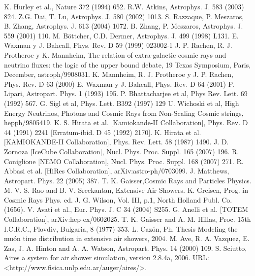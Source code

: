 \begin{thebibliography}{1}
 K. Hurley et al., Nature 372 (1994) 652.
 R.W. Atkins, Astrophys. J. 583 (2003) 824.
 Z.G. Dai, T. Lu, Astrophys. J. 580 (2002) 1013.
 S. Razzaque, P. Meszaros, B. Zhang, Astrophys. J. 613 (2004) 1072.
 B. Zhang, P. Meszaros, Astrophys. J. 559 (2001) 110.
 M. Böttcher, C.D. Dermer, Astrophys. J. 499 (1998) L131.
 E. Waxman y J. Bahcall, Phys. Rev. D 59 (1999) 023002-1
 J. P. Rachen, R. J. Protheroe y K. Mannheim, The relation of extra-galactic cosmic rays and neutrino fluxes: the logic of the upper bound debate, 19 Texas Symposium, Paris, December, astroph/9908031.
 K. Mannheim, R. J. Protheroe y J. P. Rachen, Phys. Rev. D 63 (2000)
 E. Waxman y J. Bahcall, Phys. Rev. D 64 (2001) 
 P. Lipari, Astropart. Phys. 1 (1993) 195.
 P. Bhattacharjee et al, Phys Rev. Lett. 69 (1992) 567.
G. Sigl et al, Phys. Lett. B392 (1997) 129
 U. Wichoski et al, High Energy Neutrinos, Photons and Cosmic Rays from Non-Scaling Cosmic strings, hepph/9805419.
 K. S. Hirata et al. [Kamiokande-II Collaboration], Phys. Rev. D 44 (1991) 2241 [Erratum-ibid. D 45 (1992) 2170].
 K. Hirata et al. [KAMIOKANDE-II Collaboration], Phys. Rev. Lett. 58 (1987) 1490.
 J. D. Zornoza [IceCube Collaboration], Nucl. Phys. Proc. Suppl. 165 (2007) 196.
 R. Coniglione [NEMO Collaboration], Nucl. Phys. Proc. Suppl. 168 (2007) 271.
 R. Abbasi et al. [HiRes Collaboration], arXiv:astro-ph/0703099.
 J. Matthews, Astropart. Phys. 22 (2005) 387.
 T. K. Gaisser,Cosmic Rays and Particles Physics.
 M. V. S. Rao and B. V. Sreekantan, Extensive Air Showers.
 K. Greisen, Prog. in Cosmic Rays Phys. ed. J. G. Wilson, Vol. III, p.1, North Holland Publ. Co. (1656).
 V. Avati et al., Eur. Phys. J. C 34 (2004) S255.
 G. Anelli et al. [TOTEM Collaboration], arXiv:hep-ex/0602025.
 T. K. Gaisser and A. M. Hillas, Proc. 15th I.C.R.C., Plovdiv, Bulgaria, 8 (1977) 353.
 L. Cazón, Ph. Thesis Modeling the muón time distribution in extensive air showers, 2004.
 M. Ave, R. A. Vazquez, E. Zas, J. A. Hinton and A. A. Watson, Astropart. Phys. 14 (2000) 109.
 S. Sciutto, {\sc Aires} a system for air shower simulation, version 2.8.4a, 2006. URL: <http://www.fisica.unlp.edu.ar/auger/aires/>.

\end{thebibliography}
